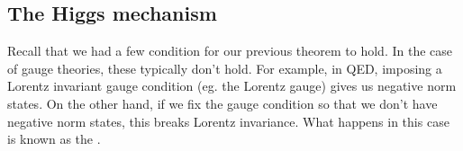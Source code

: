 \documentclass[a4paper]{article}
\begin{document}
%
%
%

\subsection{The Higgs mechanism}
Recall that we had a few condition for our previous theorem to hold. In the case of gauge theories, these typically don't hold. For example, in QED, imposing a Lorentz invariant gauge condition (eg. the Lorentz gauge) gives us negative norm states. On the other hand, if we fix the gauge condition so that we don't have negative norm states, this breaks Lorentz invariance. What happens in this case is known as the .
\end{document}
